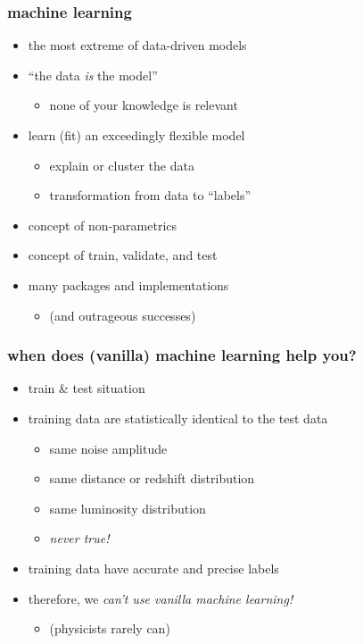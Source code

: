 \documentclass[pdftex]{beamer}
\begin{document}
\begin{frame}
  \frametitle{machine learning}
  \begin{itemize}
  \item the most extreme of data-driven models
  \item ``the data \emph{is} the model''
    \begin{itemize}
    \item none of your knowledge is relevant
    \end{itemize}
  \item learn (fit) an exceedingly flexible model
    \begin{itemize}
    \item explain or cluster the data
    \item transformation from data to ``labels''
    \end{itemize}
  \item concept of non-parametrics
  \item concept of train, validate, and test
  \item many packages and implementations
    \begin{itemize}
    \item (and outrageous successes)
    \end{itemize}
  \end{itemize}
\end{frame}

\begin{frame}
  \frametitle{when does (vanilla) machine learning help you?}
  \begin{itemize}
  \item train \& test situation
  \item training data are statistically identical to the test data
    \begin{itemize}
    \item same noise amplitude
    \item same distance or redshift distribution
    \item same luminosity distribution
    \item \emph{never true!}
    \end{itemize}
  \item training data have accurate and precise labels
  \item therefore, we \emph{can't use vanilla machine learning!}
    \begin{itemize}
    \item (physicists rarely can)
    \end{itemize}
  \end{itemize}
\end{frame}
\end{document}
